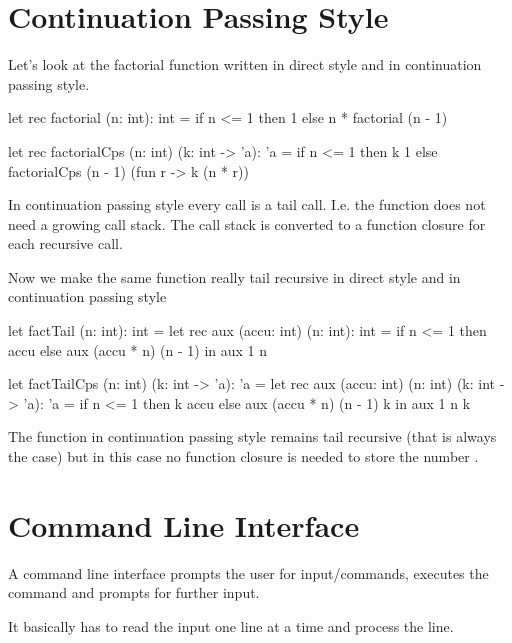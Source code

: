 \section{Continuation Passing Style}

Let's look at the factorial function written in direct style and in continuation
passing style.

\begin{ocaml}
    let rec factorial (n: int): int =
        if n <= 1 then
            1
        else
            n * factorial (n - 1)

    let rec factorialCps (n: int) (k: int -> 'a): 'a =
        if n <= 1 then
            k 1
        else
            factorialCps
                    (n - 1)
                    (fun r ->
                         k (n * r))
\end{ocaml}

In continuation passing style every call is a tail call. I.e. the function does
not need a growing call stack. The call stack is converted to a function closure
for each recursive call.

Now we make the same function really tail recursive in direct style and in
continuation passing style

\begin{ocaml}
let factTail (n: int): int =
    let rec aux (accu: int) (n: int): int =
        if n <= 1 then
            accu
        else
            aux (accu * n) (n - 1)
    in
    aux 1 n

let factTailCps (n: int) (k: int -> 'a): 'a =
    let rec aux (accu: int) (n: int) (k: int -> 'a): 'a =
        if n <= 1 then
            k accu
        else
            aux (accu * n) (n - 1) k
    in
    aux 1 n k
\end{ocaml}

The function in continuation passing style remains tail recursive (that is
always the case) but in this case no function closure is needed to store the
number .





\section{Command Line Interface}

A command line interface prompts the user for input/commands, executes the
command and prompts for further input.

It basically has to read the input one line at a time and process the line.

